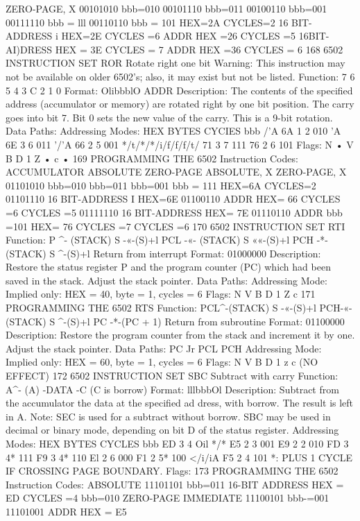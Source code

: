 \documentclass{book}
\begin{document}
ZERO-PAGE, X
00101010
bbb=010
00101110
bbb=011
00100110
bbb=001
00111110
bbb = lll
00110110
bbb = 101
HEX=2A CYCLES=2
16 BIT-ADDRESS
i
HEX=2E CYCLES =6
ADDR
HEX =26 CYCLES =5
16BIT-AI)DRESS
HEX = 3E CYCLES = 7
ADDR
HEX =36 CYCLES = 6
168
6502 INSTRUCTION SET
ROR Rotate right one bit
Warning: This instruction may not be available on older 6502's;
also, it may exist but not be listed.
Function:
7 6 5 4 3
C
2 1 0
Format: OlibbblO ADDR
Description:
The contents of the specified address (accumulator or memory)
are rotated right by one bit position. The carry goes into bit 7. Bit 0
sets the new value of the carry. This is a 9-bit rotation.
Data Paths:
Addressing Modes:
HEX
BYTES
CYCIES
bbb
/'A
6A
1
2
010
'A
6E
3
6
011
'/'A
66
2
5
001
*/t/*/*/i/f/f/f/t/
71
3
7
111
76
2
6
101
Flags:
N
•
V B D 1 Z
•
c
•
169
PROGRAMMING THE 6502
Instruction Codes:
ACCUMULATOR
ABSOLUTE
ZERO-PAGE
ABSOLUTE, X
ZERO-PAGE, X
01101010
bbb=010
bbb=011
bbb=001
bbb = 111
HEX=6A CYCLES=2
01101110 16 BIT-ADDRESS
I
HEX=6E
01100110 ADDR
HEX= 66
CYCLES =6
CYCLES =5
01111110 16 BIT-ADDRESS
HEX= 7E
01110110 ADDR
bbb =101 HEX= 76
CYCLES =7
CYCLES =6
170
6502 INSTRUCTION SET
RTI
Function:
P ^- (STACK)
S -«-(S)+l
PCL -«- (STACK)
S ««-(S)+l
PCH -*- (STACK)
S ^-(S)+l
Return from interrupt
Format: 01000000
Description:
Restore the status register P and the program counter (PC)
which had been saved in the stack. Adjust the stack pointer.
Data Paths:
Addressing Mode:
Implied only:
HEX = 40, byte = 1, cycles = 6
Flags:
N V B D 1 Z c
171
PROGRAMMING THE 6502
RTS
Function:
PCL^-(STACK)
S -«-(S)+l
PCH-«- (STACK)
S ^-(S)+l
PC -*-(PC + 1)
Return from subroutine
Format: 01100000
Description:
Restore the program counter from the stack and increment it
by one. Adjust the stack pointer.
Data Paths:
PC Jr PCL
PCH
Addressing Mode:
Implied only:
HEX = 60, byte = 1, cycles = 6
Flags:
N V B D 1 z c
(NO EFFECT)
172
6502 INSTRUCTION SET
SBC Subtract with carry
Function:
A^- (A) -DATA -C (C is borrow)
Format: lllbbbOl
Description:
Subtract from the accumulator the data at the specified ad
dress, with borrow. The result is left in A. Note: SEC is used for a
subtract without borrow.
SBC may be used in decimal or binary mode, depending on bit
D of the status register.
Addressing Modes:
HEX
BYTES
CYCLES
bbb
ED
3
4
Oil
*/*
E5
2
3
001
E9
2
2
010
FD
3
4*
111
F9
3
4*
110
El
2
6
000
F1
2
5*
100
</i/iA
F5
2
4
101
*: PLUS 1 CYCLE IF CROSSING PAGE BOUNDARY.
Flags:
173
PROGRAMMING THE 6502
Instruction Codes:
ABSOLUTE 11101101
bbb=011
16-BIT ADDRESS
HEX = ED CYCLES =4
bbb=010
ZERO-PAGE
IMMEDIATE
11100101
bbb-=001
11101001
ADDR
HEX = E5
\end{document}
